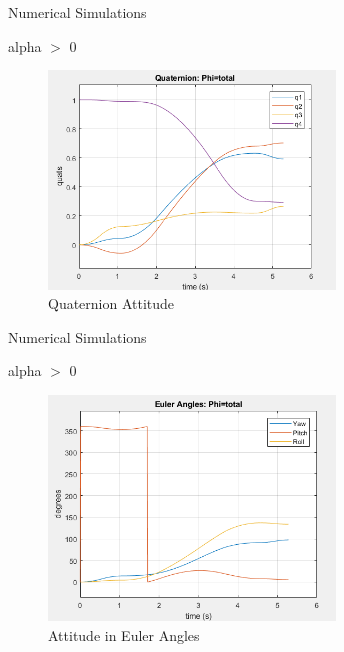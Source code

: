 \documentclass{beamer}
\begin{document}
\begin{frame}{Numerical Simulations}
	\begin{block}{alpha $>$ 0}
		
		\begin{figure}[H]
			\label{fig:quats_phi_total}
			\begin{center}
				\includegraphics[width=3in]{figures/alphaNot0/quats_phi_total.png}
			\end{center}
			\caption{Quaternion Attitude}
		\end{figure}
		
		
	\end{block}
\end{frame}
\begin{frame}{Numerical Simulations}
	\begin{block}{alpha $>$ 0}
		
		\begin{figure}[H]
			\label{fig:euler_ang_phi_total}
			\begin{center}
				\includegraphics[width=3in]{figures/alphaNot0/euler_ang_phi_total.png}
			\end{center}
			\caption{Attitude in Euler Angles}
		\end{figure}
		
	\end{block}
\end{frame}
\end{document}
